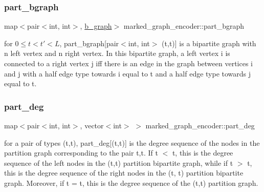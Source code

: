 \mbox{\label{classmarked__graph__encoder_a5faebef707fb681c0b6c2ccf64abc04c}} 
\subsubsection{\texorpdfstring{part\+\_\+bgraph}{part\_bgraph}}
{\footnotesize\ttfamily map$<$pair$<$int, int$>$, \hyperlink{classb__graph}{b\+\_\+graph}$>$ marked\+\_\+graph\+\_\+encoder\+::part\+\_\+bgraph\hspace{0.3cm}{\ttfamily [private]}}



for $0 \leq t < t' < L$, part\+\_\+bgraph\mbox{[}pair$<$int, int$>$ (t,t\textquotesingle{})\mbox{]} is a bipartite graph with n left vertex and n right vertex. In this bipartite graph, a left vertex i is connected to a right vertex j iff there is an edge in the graph between vertices i and j with a half edge type towards i equal to t and a half edge type towards j equal to t\textquotesingle{}. 

\mbox{\label{classmarked__graph__encoder_a55ea2edb2609dfc287432f61900d6ad1}} 
\subsubsection{\texorpdfstring{part\+\_\+deg}{part\_deg}}
{\footnotesize\ttfamily map$<$pair$<$int, int$>$, vector$<$int$>$ $>$ marked\+\_\+graph\+\_\+encoder\+::part\+\_\+deg\hspace{0.3cm}{\ttfamily [private]}}



for a pair of types (t,t\textquotesingle{}), part\+\_\+deg\mbox{[}(t,t\textquotesingle{})\mbox{]} is the degree sequence of the nodes in the partition graph corresponding to the pair t,t\textquotesingle{}. If t $<$ t\textquotesingle{}, this is the degree sequence of the left nodes in the (t,t\textquotesingle{}) partition bipartite graph, while if t $>$ t\textquotesingle{}, this is the degree sequence of the right nodes in the (t\textquotesingle{}, t) partition bipartite graph. Moreover, if t = t\textquotesingle{}, this is the degree sequence of the (t,t) partition graph. 

